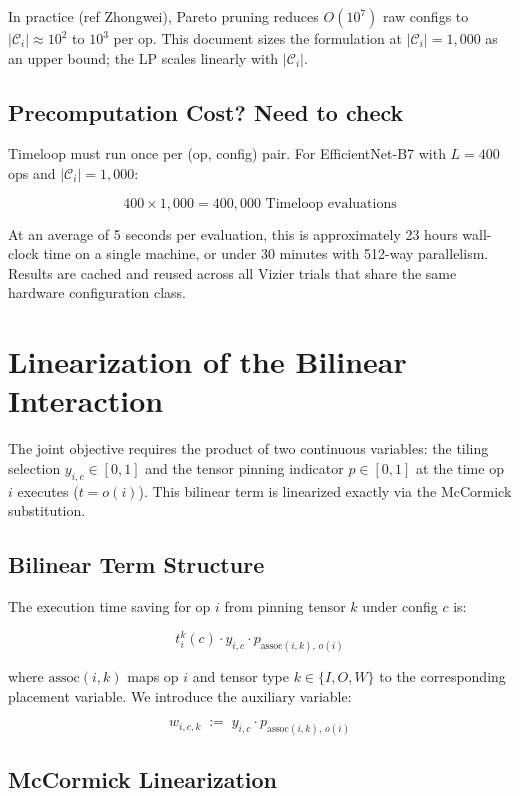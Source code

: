 \documentclass{article}
\begin{document}
In practice (ref Zhongwei), Pareto pruning reduces $O(10^7)$ raw configs to $|\mathcal{C}_i| \approx 10^2$
to $10^3$ per op. This document sizes the formulation at $|\mathcal{C}_i| = 1{,}000$
as an upper bound; the LP scales linearly with $|\mathcal{C}_i|$.

\subsection{Precomputation Cost? Need to check}

Timeloop must run once per (op, config) pair. For EfficientNet-B7 with $L = 400$ ops and
$|\mathcal{C}_i| = 1{,}000$:

\[
  400 \times 1{,}000 = 400{,}000 \text{ Timeloop evaluations}
\]

At an average of 5 seconds per evaluation, this is approximately 23 hours wall-clock time
on a single machine, or under 30 minutes with 512-way parallelism. Results are cached and
reused across all Vizier trials that share the same hardware configuration class.

\section{Linearization of the Bilinear Interaction}

The joint objective requires the product of two continuous variables: the tiling selection
$y_{i,c} \in [0,1]$ and the tensor pinning indicator $p \in [0,1]$ at the time op $i$
executes ($t = o(i)$). This bilinear term is linearized exactly via the
McCormick substitution.

\subsection{Bilinear Term Structure}

The execution time saving for op $i$ from pinning tensor $k$ under config $c$ is:

\[
  t_i^k(c) \cdot y_{i,c} \cdot p_{\text{assoc}(i,k),\, o(i)}
\]

where $\text{assoc}(i,k)$ maps op $i$ and tensor type $k \in \{I, O, W\}$ to the
corresponding placement variable. We introduce the auxiliary variable:

\[
  w_{i,c,k} \;:=\; y_{i,c} \cdot p_{\text{assoc}(i,k),\, o(i)}
\]

\subsection{McCormick Linearization}
\end{document}
